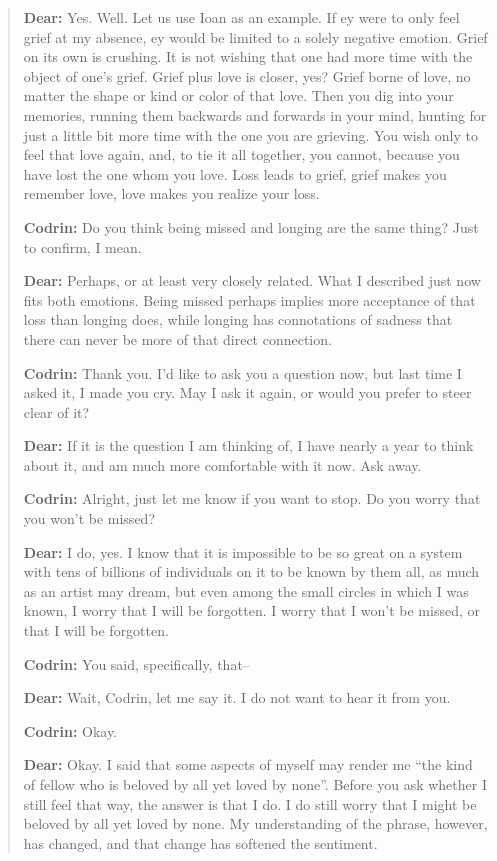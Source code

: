 \begin{quote}
\textbf{Dear:} Yes. Well. Let us use Ioan as an example. If ey were to only feel grief at my absence, ey would be limited to a solely negative emotion. Grief on its own is crushing. It is not wishing that one had more time with the object of one's grief. Grief plus love is closer, yes? Grief borne of love, no matter the shape or kind or color of that love. Then you dig into your memories, running them backwards and forwards in your mind, hunting for just a little bit more time with the one you are grieving. You wish only to feel that love again, and, to tie it all together, you cannot, because you have lost the one whom you love. Loss leads to grief, grief makes you remember love, love makes you realize your loss.

\textbf{Codrin:} Do you think being missed and longing are the same thing? Just to confirm, I mean.

\textbf{Dear:} Perhaps, or at least very closely related. What I described just now fits both emotions. Being missed perhaps implies more acceptance of that loss than longing does, while longing has connotations of sadness that there can never be more of that direct connection.

\textbf{Codrin:} Thank you. I'd like to ask you a question now, but last time I asked it, I made you cry. May I ask it again, or would you prefer to steer clear of it?

\textbf{Dear:} If it is the question I am thinking of, I have nearly a year to think about it, and am much more comfortable with it now. Ask away.

\textbf{Codrin:} Alright, just let me know if you want to stop. Do you worry that you won't be missed?

\textbf{Dear:} I do, yes. I know that it is impossible to be so great on a system with tens of billions of individuals on it to be known by them all, as much as an artist may dream, but even among the small circles in which I was known, I worry that I will be forgotten. I worry that I won't be missed, or that I will be forgotten.

\textbf{Codrin:} You said, specifically, that--

\textbf{Dear:} Wait, Codrin, let me say it. I do not want to hear it from you.

\textbf{Codrin:} Okay.

\textbf{Dear:} Okay. I said that some aspects of myself may render me ``the kind of fellow who is beloved by all yet loved by none''. Before you ask whether I still feel that way, the answer is that I do. I do still worry that I might be beloved by all yet loved by none. My understanding of the phrase, however, has changed, and that change has softened the sentiment.


\end{quote}
